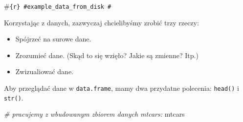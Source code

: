 \documentclass[
]{article}
\newenvironment{Shaded}{\begin{snugshade}}{\end{snugshade}}
\newcommand{\CommentTok}[1]{\textcolor[rgb]{0.56,0.35,0.01}{\textit{#1}}}
\newcommand{\NormalTok}[1]{#1}
\providecommand{\tightlist}{%
  \setlength{\itemsep}{0pt}\setlength{\parskip}{0pt}}
\begin{document}
\#\texttt{\{r\}\ \#example\_data\_from\_disk\ \#}

Korzystając z danych, zazwyczaj chcielibyśmy zrobić trzy rzeczy:

\begin{itemize}
\tightlist
\item
  Spójrzeć na surowe dane.
\item
  Zrozumieć dane. (Skąd to się wzięło? Jakie są zmienne? Itp.)
\item
  Zwizualiować dane.
\end{itemize}

Aby przeglądać dane w \texttt{data.frame}, mamy dwa przydatne polecenia:
\texttt{head()} i \texttt{str()}.

\begin{Shaded}
\begin{Highlighting}[]
\CommentTok{\# pracujemy z wbudowanym zbiorem danych mtcars:}
\NormalTok{mtcars}
\end{Highlighting}
\end{Shaded}
\end{document}
